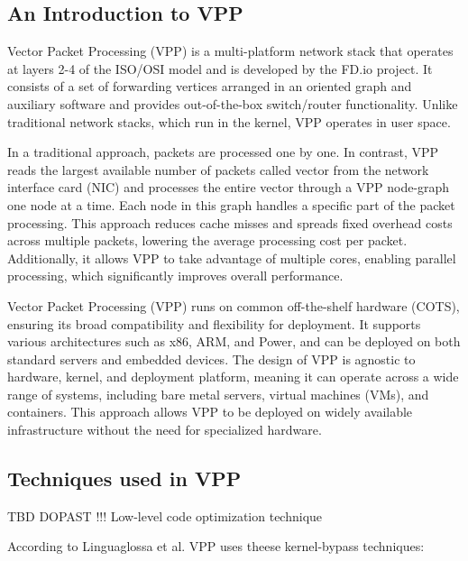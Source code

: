 \subsection{An Introduction to VPP}

Vector Packet Processing (VPP) is a multi-platform network stack that operates at layers 2-4 of the ISO/OSI model and is developed by the FD.io project. 
It consists of a set of forwarding vertices arranged in an oriented graph and auxiliary software and provides out-of-the-box switch/router functionality.
Unlike traditional network stacks, which run in the kernel, VPP operates in user space.

In a traditional approach, packets are processed one by one. In contrast, VPP reads the largest available number of packets called vector from the network interface card (NIC) 
and processes the entire vector through a VPP node-graph one node at a time. Each node in this graph handles a specific part of the packet processing.
This approach reduces cache misses and spreads fixed overhead costs across multiple packets, lowering the average processing cost per packet. 
Additionally, it allows VPP to take advantage of multiple cores, enabling parallel processing, which significantly improves overall performance.

Vector Packet Processing (VPP) runs on common off-the-shelf hardware (COTS), ensuring its broad compatibility and flexibility for deployment. 
It supports various architectures such as x86, ARM, and Power, and can be deployed on both standard servers and embedded devices. 
The design of VPP is agnostic to hardware, kernel, and deployment platform, meaning it can operate across a wide range of systems, including bare metal servers, virtual machines (VMs), and containers. 
This approach allows VPP to be deployed on widely available infrastructure without the need for specialized hardware.\cite{fdio_what_is_vpp}

\subsection{Techniques used in VPP}

TBD
DOPAST !!! Low-level code optimization technique

According to Linguaglossa et al.\cite{LINGUAGLOSSA} VPP uses theese kernel-bypass techniques:

